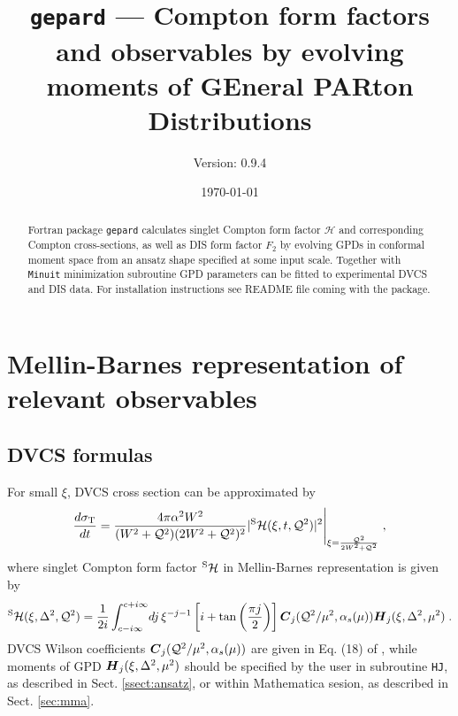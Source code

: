 \documentclass[12pt]{article}
\begin{document}
\title{\texttt{gepard} --- Compton form factors and observables
                            by evolving moments of GEneral PARton Distributions}
\author{Version: 0.9.4}
\date{\today}
\maketitle

\begin{abstract}
Fortran package \texttt{gepard} calculates singlet Compton form factor
$\mathcal{H}$ and corresponding Compton cross-sections, as well as
DIS form factor $F_2$ by evolving GPDs in conformal moment space from an ansatz shape
specified at some input scale.  Together
with \texttt{Minuit} minimization subroutine GPD parameters can be fitted to
experimental DVCS and DIS data. For installation instructions
see README file coming with the package.
\end{abstract}

\tableofcontents
\clearpage

\section{Mellin-Barnes representation of relevant observables}

\subsection{DVCS formulas}  

For small $\xi$, DVCS cross section can be approximated by 
\begin{equation}
\frac{d \sigma_{\rm T}}{d t} = \frac{4 \pi \alpha^2 W^2}{(W^2 + \mathcal{Q}^2)
(2 W^2 + \mathcal{Q}^2)^2} | ^{\rm S}\mathcal{H}(\xi, t, \mathcal{Q}^2)|^2 \Bigg|_{\xi
= \frac{\mathcal{Q}^2}{2 W^2 + \mathcal{Q}^2}} \;,
\label{eq:parsigma}
\end{equation}
where singlet Compton form factor $^{\rm S}\mathcal{H}$ in Mellin-Barnes representation is given by
\begin{equation}
{^{\rm S}{\cal H}}(\xi,\Delta^2,{\cal Q}^2)
= \frac{1}{2i}\int_{c-i \infty}^{c+ i \infty}\!
dj\,\xi^{-j-1} \left[i + \tan \left(\frac{\pi j}{2}\right) \right]
\mbox{\boldmath $C$}_{j}({\cal Q}^2/\mu^2,\alpha_s(\mu)) 
\mbox{\boldmath $H$}_{j} (\xi,\Delta^2,\mu^2) \;.
\label{eq:CFF}
\end{equation}
DVCS Wilson coefficients $\mbox{\boldmath $C$}_{j}({\cal Q}^2/\mu^2,\alpha_s(\mu))$
are given in Eq. (18) of \cite{Kumericki:2006xx}, while moments of
GPD $\mbox{\boldmath $H$}_{j} (\xi,\Delta^2,\mu^2)$ should be specified
by the user in subroutine \texttt{HJ}, as described in Sect. \ref{ssect:ansatz}, or
within Mathematica sesion, as described in Sect. \ref{sec:mma}.
\end{document}
